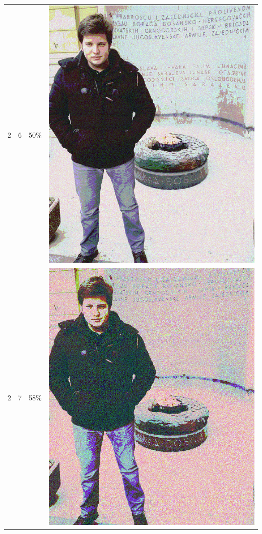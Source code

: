 \documentclass[times, utf8, seminar, numeric]{fer}
\begin{document}
\begin{center}
\begin{longtable}{|c|c|c|c|}
2 & 6 &50\% & \includegraphics[scale=0.3]{../benchmark_results/pattern/2_components-6_bits.png} \\
2 & 7 &58\% & \includegraphics[scale=0.3]{../benchmark_results/pattern/2_components-7_bits.png} \\

\end{longtable}
\end{center}
\end{document}
